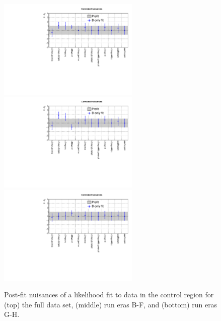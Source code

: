 \begin{figure}[h!]
  \centering
  \includegraphics[width=0.6\textwidth]{figures/btag/nuisances/full/Correlated_nuisances}
  \includegraphics[width=0.6\textwidth]{figures/btag/nuisances/BF/Correlated_nuisances}
  \includegraphics[width=0.6\textwidth]{figures/btag/nuisances/GH/Correlated_nuisances}
  \caption{\label{fig:btagsf} Post-fit nuisances of a likelihood fit
    to data in the \mmj control region for (top) the full data set,
    (middle) run eras B-F, and (bottom) run eras G-H.}
\end{figure}

